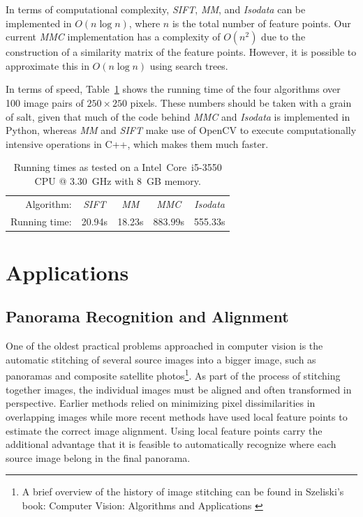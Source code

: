 \documentclass{article}
\begin{document}
In terms of computational complexity, \emph{SIFT}, \emph{MM}, and \emph{Isodata} can be 
implemented in $O(n\log n)$, where $n$ is the total number of feature 
points.  Our current \emph{MMC} implementation has a complexity of $O(n^2)$ due to the 
construction of a similarity matrix of the feature points. However, it is 
possible to approximate this in $O(n\log n)$ using search trees.  

In terms of speed, Table~\ref{table:running_times} shows the 
running time of the four algorithms over 100 image pairs of $250\!\times\!250$ pixels. 
These numbers should be taken with a grain of salt, given that 
much of the code behind \emph{MMC} and \emph{Isodata} is implemented in 
Python, whereas \emph{MM} and \emph{SIFT} make use of OpenCV to execute 
computationally intensive operations in C++, which makes them much 
faster. 

\begin{table}[htb]
\caption{Running times as tested on a Intel\textregistered\ Core\texttrademark\ i5-3550 CPU @ 
3.30~GHz with 8~GB memory.}
\label{table:running_times}
	\centering
\begin{tabular}{r*{4}{c}}
\hline
	Algorithm: & \emph{SIFT} & \emph{MM} & \emph{MMC} & \emph{Isodata} 
	\\
	\noalign{\smallskip} 
	Running time: & 20.94s & 18.23s & 883.99s & 555.33s \\
	\hline
\end{tabular}
\end{table}
%

\section{Applications}

\subsection{Panorama Recognition and Alignment}
One of the oldest practical problems approached in computer vision is 
the automatic stitching of several source images into a bigger image, 
such as panoramas and composite satellite photos\footnote{A brief 
overview of the history of image stitching can be found in Szeliski's 
book: Computer Vision: Algorithms and Applications \cite{szeliski2010}}.  
As part of the process of stitching together images, the individual 
images must be aligned and often transformed in perspective. Earlier 
methods relied on minimizing pixel dissimilarities in overlapping images 
while more recent methods have used local feature points to estimate the 
correct image alignment. Using local feature points carry the additional 
advantage that it is feasible to automatically recognize where each 
source image belong in the final panorama.
\end{document}
